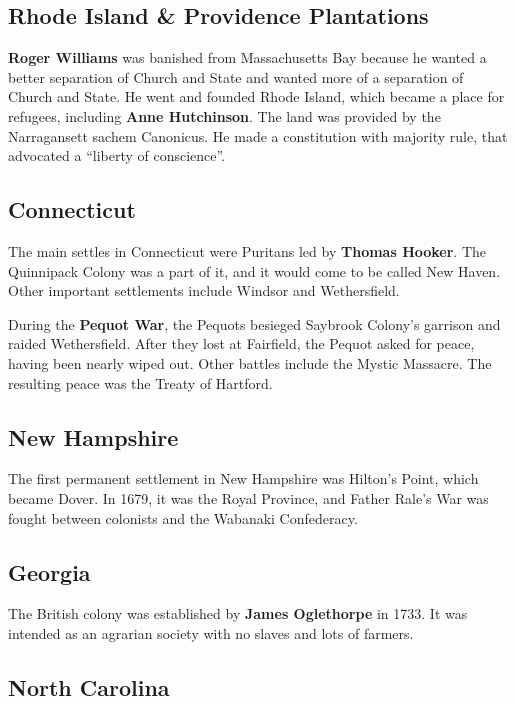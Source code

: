 \subsection*{Rhode Island \& Providence Plantations}

\textbf{Roger Williams} was banished from Massachusetts Bay because he wanted a better separation of Church and State
and wanted more of a separation of Church and State.
He went and founded Rhode Island, which became a place for refugees, including \textbf{Anne Hutchinson}.
The land was provided by the Narragansett sachem Canonicus.
He made a constitution with majority rule, that advocated a ``liberty of conscience''.

\subsection*{Connecticut}

The main settles in Connecticut were Puritans led by \textbf{Thomas Hooker}.
The Quinnipack Colony was a part of it, and it would come to be called New Haven.
Other important settlements include Windsor and Wethersfield.

During the \textbf{Pequot War}, the Pequots besieged Saybrook Colony's garrison and raided Wethersfield.
After they lost at Fairfield, the Pequot asked for peace, having been nearly wiped out.
Other battles include the Mystic Massacre.
The resulting peace was the Treaty of Hartford.

\subsection*{New Hampshire}

The first permanent settlement in New Hampshire was Hilton's Point, which became Dover.
In 1679, it was the Royal Province,
and Father Rale's War was fought between colonists and the Wabanaki Confederacy.

\subsection*{Georgia}

The British colony was established by \textbf{James Oglethorpe} in 1733.
It was intended as an agrarian society with no slaves and lots of farmers.

\subsection*{North Carolina}

